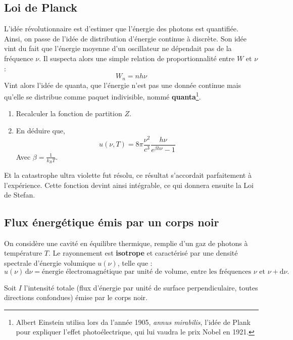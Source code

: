 \documentclass[a4paper,10pt]{report}
\begin{document}
	\subsection{Loi de Planck}
	L'idée révolutionnaire est d'estimer que l'énergie des photons est quantifiée.
	Ainsi, on passe de l'idée de distribution d'énergie continue à discrète. 
	Son idée vint du fait que l'énergie moyenne d'un oscillateur ne dépendait pas de la fréquence $\nu$. Il suspecta alors une simple relation de proportionnalité entre $W$ et $\nu$ :
	$$W_n = nh\nu$$
	Vint alors l'idée de quanta, que l'énergie n'est pas une donnée continue mais qu'elle se distribue comme paquet indivisible, nommé \textbf{quanta}\footnote{Albert Einstein utilisa lors da l'année 1905, \textit{annus mirabilis}, l'idée de Plank pour expliquer l'effet photoélectrique, qui lui vaudra le prix Nobel en 1921.}.
\begin{enumerate}
	\item Recalculer la fonction de partition $Z$.
	\item En déduire que,
	$$u(\nu, T) = 8\pi\frac{\nu^2}{c^3} \frac{h\nu}{e^{\beta h \nu}-1}$$
	Avec $\beta = \frac 1 {k_B T}$.
\end{enumerate}
Et la catastrophe ultra violette fut résolu, ce résultat s'accordait parfaitement à l'expérience.
Cette fonction devint ainsi intégrable, ce qui donnera ensuite la Loi de Stefan.
	
\subsection{Flux énergétique émis par un corps noir}

On considère une cavité en équilibre thermique, remplie d’un gaz de photons à température $T$. Le rayonnement est \textbf{isotrope} et caractérisé par une densité spectrale d’énergie volumique $u(\nu)$, telle que :
\[
u(\nu)\, \text{d}\nu = \text{énergie électromagnétique par unité de volume, entre les fréquences } \nu \text{ et } \nu + \text{d}\nu.
\]

Soit $I$ l’intensité totale (flux d’énergie par unité de surface perpendiculaire, toutes directions confondues) émise par le corps noir.
\end{document}
